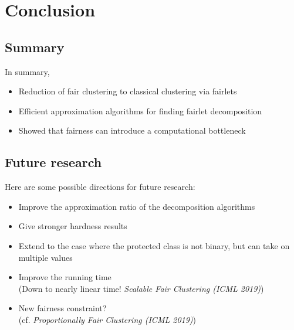 \chapter{Conclusion}

\section{Summary}

In summary,

\begin{itemize}
	\item Reduction of fair clustering to classical clustering via fairlets

	\item Efficient approximation algorithms for finding fairlet decomposition

	\item Showed that fairness can introduce a computational bottleneck
\end{itemize}

\section{Future research}

Here are some possible directions for future research:


\begin{itemize}
	\item Improve the approximation ratio of the decomposition algorithms
	\item Give stronger hardness results
	\item Extend to the case where the protected class is not binary, but can take on multiple values
	\item Improve the running time \\
	(Down to nearly linear time! {\it Scalable Fair Clustering (ICML 2019)})
	\item New fairness constraint? \\
	(cf. {\it Proportionally Fair Clustering (ICML 2019)})
\end{itemize}